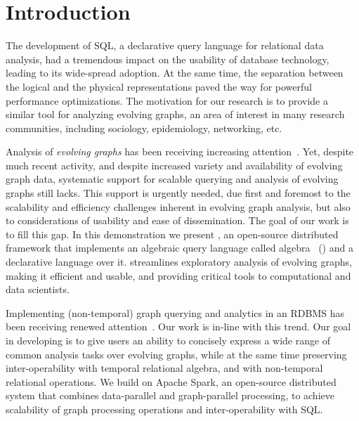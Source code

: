 \section{Introduction}
\label{sec:intro}

The development of SQL, a declarative query language for relational
data analysis, had a tremendous impact on the usability of database
technology, leading to its wide-spread adoption. At the same time, the
separation between the logical and the physical representations paved
the way for powerful performance optimizations. The motivation for our
research is to provide a similar tool for analyzing evolving graphs,
an area of interest in many research communities, including sociology,
epidemiology, networking, etc.

Analysis of {\em evolving graphs} has been receiving increasing
attention~\cite{DBLP:journals/csur/AggarwalS14,Miao2015,Semertzidis2015}.
Yet, despite much recent activity, and despite increased variety and
availability of evolving graph data, systematic support for scalable
querying and analysis of evolving graphs still lacks.  This support is
urgently needed, due first and foremost to the scalability and
efficiency challenges inherent in evolving graph analysis, but also to
considerations of usability and ease of dissemination.  The goal of
our work is to fill this gap.  In this demonstration we present
\sys, an open-source distributed framework that implements an
algebraic query language called \tg algebra~\cite{PortalarXiv2016}
(\tga) and a declarative language \ql over it. \sys streamlines
exploratory analysis of evolving graphs, making it efficient and
usable, and providing critical tools to computational and data
scientists.

Implementing (non-temporal) graph querying and analytics in an RDBMS
has been receiving renewed
attention~\cite{DBLP:conf/sigmod/AbergerTOR16,DBLP:journals/pvldb/Xirogiannopoulos15}.
Our work is in-line with this trend.  Our goal in developing \sys is
to give users an ability to concisely express a wide range of common
analysis tasks over evolving graphs, while at the same time preserving
inter-operability with temporal relational algebra, and with
non-temporal relational operations.  We build on Apache Spark, an
open-source distributed system that combines data-parallel and
graph-parallel processing, to achieve scalability of graph processing
operations and inter-operability with SQL.


